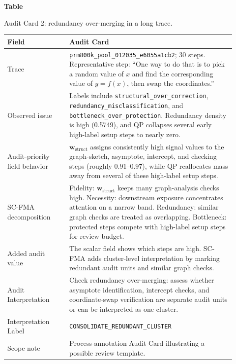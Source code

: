 \documentclass[pdflatex,sn-mathphys-num]{sn-jnl}
\newcommand{\wstruct}{\ensuremath{\mathbf{w}_{\mathrm{struct}}}}
\begin{document}
\clearpage
\par\medskip
{}\label{tab:audit-card-redundancy}
\noindent\textbf{Table~\thetable}\par
\noindent Audit Card 2: redundancy over-merging in a long trace.
\begin{center}
\small
\renewcommand{\arraystretch}{1.08}
\begin{tabular}{p{0.25\linewidth}p{0.67\linewidth}}
\toprule
\textbf{Field} & \textbf{Audit Card} \\
\midrule
Trace & \texttt{prm800k\_pool\_012035\_e6055a1cb2}; 30 steps. Representative step: ``One way to do that is to pick a random value of $x$ and find the corresponding value of $y=f(x)$, then swap the coordinates.'' \\
Observed issue & Labels include \texttt{structural\_over\_correction}, \texttt{redundancy\_misclassification}, and \texttt{bottleneck\_over\_protection}. Redundancy density is high (0.5749), and QP collapses several early high-label setup steps to nearly zero. \\
Audit-priority field behavior & \wstruct{} assigns consistently high signal values to the graph-sketch, asymptote, intercept, and checking steps (roughly 0.91--0.97), while QP reallocates mass away from several of these high-label setup steps. \\
SC-FMA decomposition & Fidelity: \wstruct{} keeps many graph-analysis checks high. Necessity: downstream exposure concentrates attention on a narrow band. Redundancy: similar graph checks are treated as overlapping. Bottleneck: protected steps compete with high-label setup steps for review budget. \\
Added audit value & The scalar field shows which steps are high. SC-FMA adds cluster-level interpretation by marking redundant audit units and similar graph checks. \\
Audit Interpretation & Check redundancy over-merging: assess whether asymptote identification, intercept checks, and coordinate-swap verification are separate audit units or can be interpreted as one cluster. \\
Interpretation Label & \texttt{CONSOLIDATE\_REDUNDANT\_CLUSTER} \\
Scope note & Process-annotation Audit Card illustrating a possible review template. \\
\bottomrule
\end{tabular}
\end{center}
\medskip
\end{document}
